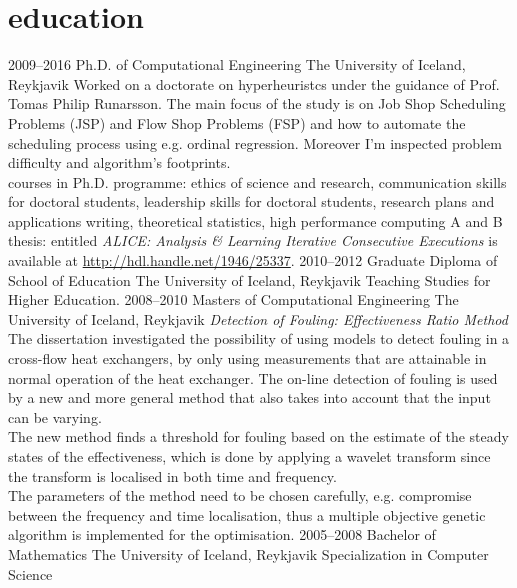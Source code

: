 \documentclass[]{cv} %
\begin{document}
\section{education}
\begin{entrylist}
\entry
{2009--2016}
{Ph.D. {\normalfont of Computational Engineering}}
{The University of Iceland, Reykjavik}
{Worked on a doctorate on hyperheuristcs under the guidance of Prof. Tomas 
Philip Runarsson. The main focus of the study is on Job Shop Scheduling 
Problems (JSP) and Flow Shop Problems (FSP) and how to automate the scheduling 
process using e.g. ordinal regression. Moreover I'm inspected problem 
difficulty and algorithm's footprints. \\
{\boldfont courses in Ph.D. programme:} 
ethics of science and research, communication skills for doctoral students, leadership skills for doctoral students, research plans and applications writing, theoretical statistics, high performance computing A and B  \\
{\boldfont thesis:} entitled \emph{ALICE: Analysis \& Learning Iterative 
Consecutive Executions} is available at \url{http://hdl.handle.net/1946/25337}.}
\entry
{2010--2012}
{Graduate Diploma {\normalfont of School of Education}}
{The University of Iceland, Reykjavik}
{Teaching Studies for Higher Education.}
\entry
{2008--2010}
{Masters {\normalfont of Computational Engineering}}
{The University of Iceland, Reykjavik}
{\emph{Detection of Fouling: Effectiveness Ratio Method} \\ 
The dissertation investigated the possibility of using models to detect fouling in a cross-flow heat exchangers, by only using measurements that are attainable in normal operation of the heat exchanger.  The on-line detection of fouling is used by a new and more general method that also takes into account that the input can be varying. \\
The new method finds a threshold for fouling based on the estimate of the steady states of the effectiveness, which is done by applying a wavelet transform since the transform is localised in both time and frequency. \\
The parameters of the method need to be chosen carefully, e.g. compromise between the frequency and time localisation, thus a multiple objective genetic algorithm is implemented for the optimisation. }
\entry
{2005--2008}
{Bachelor {\normalfont of Mathematics}}
{The University of Iceland, Reykjavik}
{Specialization in Computer Science}
\end{entrylist}
\end{document}
